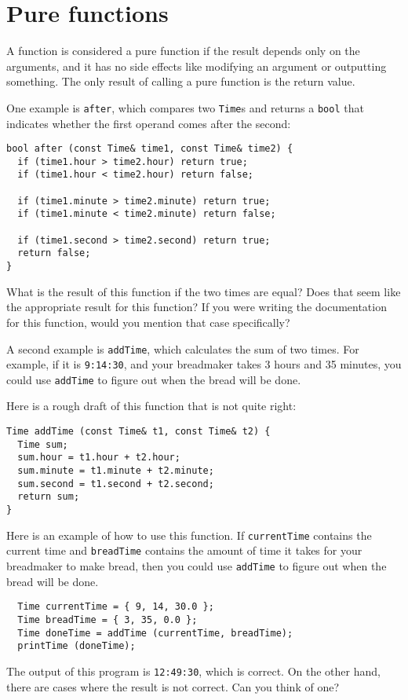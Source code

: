 \section{Pure functions}

A function is considered a pure function if the result depends only on
the arguments, and it has no side effects like modifying an argument
or outputting something.  The only result of calling a pure function is
the return value.

One example is {\tt after}, which compares two {\tt Time}s and
returns a {\tt bool} that indicates whether the first operand
comes after the second:

\begin{verbatim}
bool after (const Time& time1, const Time& time2) {
  if (time1.hour > time2.hour) return true;
  if (time1.hour < time2.hour) return false;

  if (time1.minute > time2.minute) return true;
  if (time1.minute < time2.minute) return false;

  if (time1.second > time2.second) return true;
  return false;
}
\end{verbatim}
%
What is the result of this function if the two times are equal?  Does
that seem like the appropriate result for this function?  If you were
writing the documentation for this function, would you mention that case
specifically?

A second example is {\tt addTime}, which calculates the sum of two
times.  For example, if it is {\tt 9:14:30}, and your breadmaker takes
3 hours and 35 minutes, you could use {\tt addTime} to figure out when
the bread will be done.

Here is a rough draft of this function that is not quite right:

\begin{verbatim}
Time addTime (const Time& t1, const Time& t2) {
  Time sum;
  sum.hour = t1.hour + t2.hour;
  sum.minute = t1.minute + t2.minute;
  sum.second = t1.second + t2.second;
  return sum;
}
\end{verbatim}
%
Here is an example of how to use this function.  If {\tt currentTime}
contains the current time and {\tt breadTime} contains the amount
of time it takes for your breadmaker to make bread, then you
could use {\tt addTime} to figure out when the bread will be
done.

\begin{verbatim}
  Time currentTime = { 9, 14, 30.0 };
  Time breadTime = { 3, 35, 0.0 };
  Time doneTime = addTime (currentTime, breadTime);
  printTime (doneTime);
\end{verbatim}
%
The output of this program is {\tt 12:49:30}, which is
correct.  On the other hand, there are cases where the result
is not correct.  Can you think of one?

